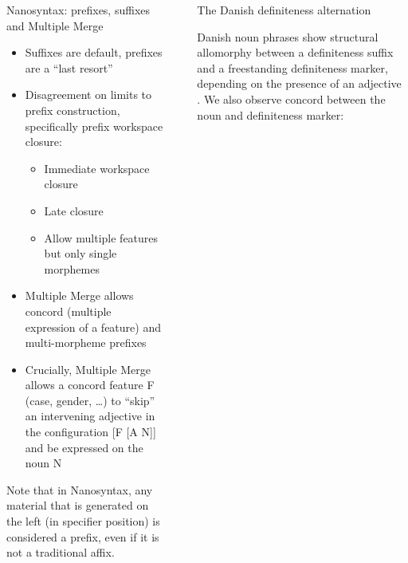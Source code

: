 \documentclass[final,20pt]{beamer}
\newlength{\sepwidth}
\newlength{\colwidth}
\newcommand{\separatorcolumn}{\begin{column}{\sepwidth}\end{column}}
\begin{document}
\begin{frame}[t]
\begin{columns}[t]
\begin{column}{\colwidth}
\begin{block}{Nanosyntax: prefixes, suffixes and Multiple Merge}
    \begin{itemize}
        \item Suffixes are default, prefixes are a “last resort” \citep{starke2018complex}
        \item Disagreement on limits to prefix construction, specifically prefix workspace closure: \\
            \begin{itemize}
            \item Immediate workspace closure \citep{caha2019case}
            \item Late closure \citep{starke2018complex}
            \item Allow multiple features but only single morphemes \citep{caha2019fine}
            \end{itemize}
        \citep{caha2019case, starke2018complex, caha2019fine}
        \item Multiple Merge \citep{caha2019case} allows concord (multiple expression of a feature) and multi-morpheme prefixes
        \item Crucially, Multiple Merge allows a concord feature F (case, gender, \ldots) to “skip” an intervening adjective in the configuration [F [A N]] and be expressed on the noun N
    \end{itemize}
    
    Note that in Nanosyntax, any material that is generated on the left (in specifier position) is considered a prefix, even if it is not a traditional affix.

\end{block}

\end{column}

\separatorcolumn

\begin{column}{\colwidth}

\begin{block}{The Danish definiteness alternation}

    Danish noun phrases show structural allomorphy between a definiteness suffix and a freestanding definiteness marker, depending on the presence of an adjective \citep{hankamer2018structure}. We also observe concord between the noun and definiteness marker:


\end{block}
\end{column}
\end{columns}
\end{frame}
\end{document}
